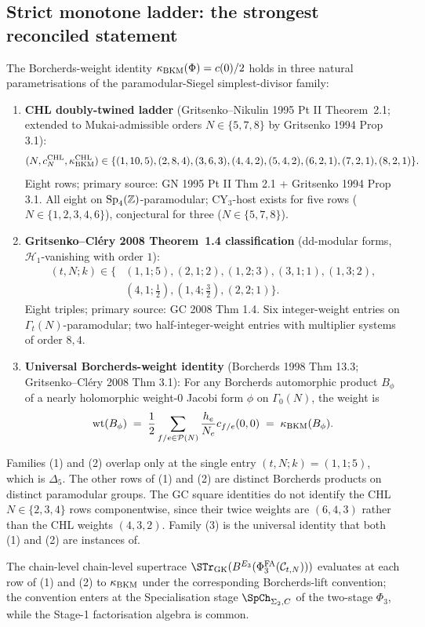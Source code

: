 \subsection*{Strict monotone ladder: the strongest reconciled statement}

\begin{theorem*}
The Borcherds-weight identity $\kappa_{\mathrm{BKM}}(\Phi) = c(0)/2$ holds in three
natural parametrisations of the paramodular-Siegel simplest-divisor
family:
\begin{enumerate}
\item \textbf{CHL doubly-twined ladder} (Gritsenko--Nikulin 1995 Pt II
Theorem~2.1; extended to Mukai-admissible orders $N \in \{5, 7, 8\}$
by Gritsenko 1994 Prop 3.1):
\[
 (N, c_N^{\mathrm{CHL}}, \kappa_{\mathrm{BKM}}^{\mathrm{CHL}}) \in
 \{(1,10,5), (2,8,4), (3,6,3), (4,4,2), (5,4,2),
   (6,2,1), (7,2,1), (8,2,1)\}.
\]
Eight rows; primary source: GN 1995 Pt II Thm 2.1 + Gritsenko 1994
Prop 3.1. All eight on $\mathrm{Sp}_4(\mathbb Z)$-paramodular; CY$_3$-host exists for
five rows ($N \in \{1, 2, 3, 4, 6\}$), conjectural for three
($N \in \{5, 7, 8\}$).

\item \textbf{Gritsenko--Cl\'ery 2008 Theorem~1.4 classification}
(dd-modular forms, $\mathcal{H}_1$-vanishing with order $1$):
\[
\begin{aligned}
 (t, N; k) \in \{&(1,1;5), (2,1;2), (1,2;3), (3,1;1), (1,3;2), \\
   &(4,1;\tfrac{1}{2}), (1,4;\tfrac{3}{2}), (2,2;1)\}.
\end{aligned}
\]
Eight triples; primary source: GC 2008 Thm 1.4. Six integer-weight
entries on $\Gamma_t(N)$-paramodular; two half-integer-weight entries
with multiplier systems of order $8, 4$.

\item \textbf{Universal Borcherds-weight identity} (Borcherds 1998
Thm 13.3; Gritsenko--Cl\'ery 2008 Thm 3.1):
For any Borcherds automorphic product $B_\phi$ of a nearly holomorphic
weight-$0$ Jacobi form $\phi$ on $\Gamma_0(N)$, the weight is
\[
 \mathrm{wt}(B_\phi) \;=\; \frac{1}{2} \sum_{f/e \in \mathcal{P}(N)}
   \frac{h_e}{N_e} c_{f/e}(0, 0) \;=\; \kappa_{\mathrm{BKM}}(B_\phi).
\]
\end{enumerate}
Families (1) and (2) overlap only at the single entry
$(t, N; k) = (1, 1; 5)$, which is $\Delta_5$. The other rows of (1)
and (2) are distinct Borcherds products on distinct paramodular
groups. The GC square identities do not identify the CHL
$N \in \{2,3,4\}$ rows componentwise, since their twice weights are
$(6,4,3)$ rather than the CHL weights $(4,3,2)$.
Family (3) is the universal identity that both (1) and (2) are
instances of.

The chain-level chain-level supertrace
$\STr_{\mathrm{GK}}(\BE{3}(\PhiFAt(\Cker_{t, N})))$ evaluates at each
row of (1) and (2) to $\kappa_{\mathrm{BKM}}$ under the corresponding Borcherds-lift
convention; the convention enters at the Specialisation stage
$\SpCh_{\Sigma_2, C}$ of the two-stage $\Phi_3$, while the Stage-1
factorisation algebra is common.
\end{theorem*}


